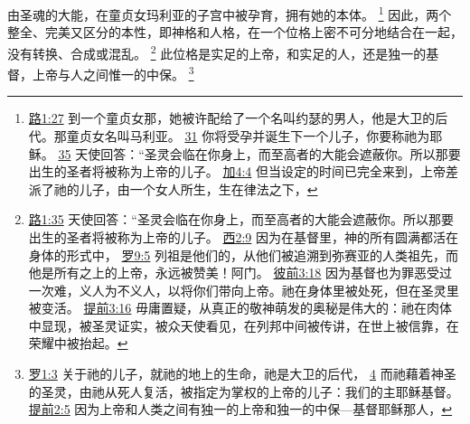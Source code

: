 \documentclass[12pt, a4paper, oneside]{ctexart}
\begin{document}
	由圣魂的大能，在童贞女玛利亚的子宫中被孕育，拥有她的本体。
	\footnote {
		\href{https://biblehub.com/luke/1-27.htm}{路1:27} 到一个童贞女那，她被许配给了一个名叫约瑟的男人，他是大卫的后代。那童贞女名叫马利亚。
		\href{https://biblehub.com/luke/1-31.htm}{31} 你将受孕并诞生下一个儿子，你要称祂为耶稣。
		\href{https://biblehub.com/luke/1-35.htm}{35} 天使回答：“圣灵会临在你身上，而至高者的大能会遮蔽你。所以那要出生的圣者将被称为上帝的儿子。
		\href{https://biblehub.com/galatians/4-4.htm}{加4:4} 但当设定的时间已完全来到，上帝差派了祂的儿子，由一个女人所生，生在律法之下，
	}
	因此，两个整全、完美又区分的本性，即神格和人格，在一个位格上密不可分地结合在一起，没有转换、合成或混乱。
	\footnote {
		\href{https://biblehub.com/luke/1-35.htm}{路1:35} 天使回答：“圣灵会临在你身上，而至高者的大能会遮蔽你。所以那要出生的圣者将被称为上帝的儿子。
		\href{https://biblehub.com/colossians/2-9.htm}{西2:9} 因为在基督里，神的所有圆满都活在身体的形式中，
		\href{https://biblehub.com/romans/9-5.htm}{罗9:5} 列祖是他们的，从他们被追溯到弥赛亚的人类祖先，而他是所有之上的上帝，永远被赞美！阿门。
		\href{https://biblehub.com/1_peter/3-18.htm}{彼前3:18} 因为基督也为罪恶受过一次难，义人为不义人，以将你们带向上帝。祂在身体里被处死，但在圣灵里被变活。
		\href{https://biblehub.com/1_timothy/3-16.htm}{提前3:16} 毋庸置疑，从真正的敬神萌发的奥秘是伟大的：祂在肉体中显现，被圣灵证实，被众天使看见，在列邦中间被传讲，在世上被信靠，在荣耀中被抬起。
	}
	此位格是实足的上帝，和实足的人，还是独一的基督，上帝与人之间惟一的中保。
	\footnote {
		\href{https://biblehub.com/romans/1-3.htm}{罗1:3} 关于祂的儿子，就祂的地上的生命，祂是大卫的后代，
		\href{https://biblehub.com/romans/1-4.htm}{4} 而祂藉着神圣的圣灵，由祂从死人复活，被指定为掌权的上帝的儿子：我们的主耶稣基督。
		\href{https://biblehub.com/1_timothy/2-5.htm}{提前2:5} 因为上帝和人类之间有独一的上帝和独一的中保---基督耶稣那人，
	}
\end{document}
